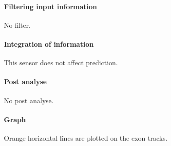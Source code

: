 \paragraph{Filtering input information}

No filter.

\paragraph{Integration of information}

This sensor does not affect prediction.

\paragraph{Post analyse}

No post analyse.

\paragraph{Graph}

Orange horizontal lines are plotted on the exon tracks.

